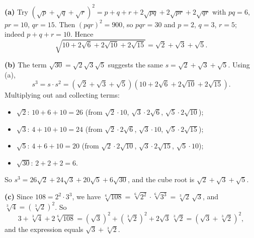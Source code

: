\textbf{(a)} Try $\left(\sqrt p+\sqrt q+\sqrt r\right)^2=p+q+r+2\sqrt{pq}+2\sqrt{pr}+2\sqrt{qr}$ with $pq=6$, $pr=10$, $qr=15$. Then $(pqr)^2=900$, so $pqr=30$ and $p=2$, $q=3$, $r=5$; indeed $p+q+r=10$. Hence
\[\sqrt{10+2\sqrt6+2\sqrt{10}+2\sqrt{15}}=\boxed{\sqrt2+\sqrt3+\sqrt5}.\]

\textbf{(b)} The term $\sqrt{30}=\sqrt2\sqrt3\sqrt5$ suggests the same $s=\sqrt2+\sqrt3+\sqrt5$. Using (a),
\[s^3=s\cdot s^2=\left(\sqrt2+\sqrt3+\sqrt5\right)\left(10+2\sqrt6+2\sqrt{10}+2\sqrt{15}\right).\]
Multiplying out and collecting terms:
\begin{itemize}
\item $\sqrt2$: $10+6+10=26$ (from $\sqrt2\cdot10$, $\sqrt3\cdot2\sqrt6$, $\sqrt5\cdot2\sqrt{10}$);
\item $\sqrt3$: $4+10+10=24$ (from $\sqrt2\cdot2\sqrt6$, $\sqrt3\cdot10$, $\sqrt5\cdot2\sqrt{15}$);
\item $\sqrt5$: $4+6+10=20$ (from $\sqrt2\cdot2\sqrt{10}$, $\sqrt3\cdot2\sqrt{15}$, $\sqrt5\cdot10$);
\item $\sqrt{30}$: $2+2+2=6$.
\end{itemize}
So $s^3=26\sqrt2+24\sqrt3+20\sqrt5+6\sqrt{30}$, and the cube root is $\boxed{\sqrt2+\sqrt3+\sqrt5}$.

\textbf{(c)} Since $108=2^2\cdot3^3$, we have $\sqrt[6]{108}=\sqrt[6]{2^2}\cdot\sqrt[6]{3^3}=\sqrt[3]2\,\sqrt3$, and $\sqrt[3]4=\left(\sqrt[3]2\right)^2$. So
\[3+\sqrt[3]4+2\sqrt[6]{108}=\left(\sqrt3\right)^2+\left(\sqrt[3]2\right)^2+2\sqrt3\,\sqrt[3]2=\left(\sqrt3+\sqrt[3]2\right)^2,\]
and the expression equals $\boxed{\sqrt3+\sqrt[3]2}$.
